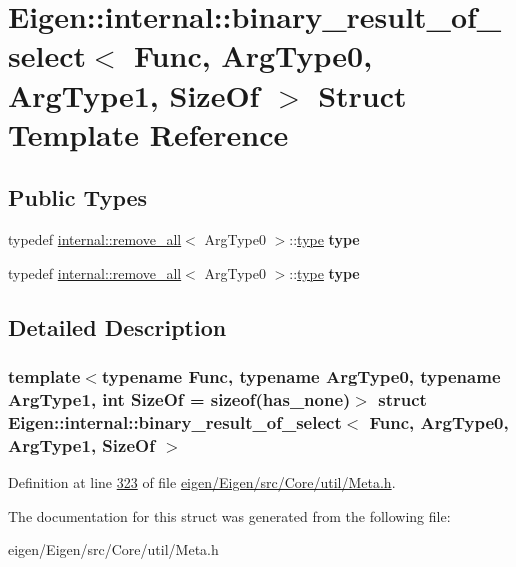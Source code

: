 \hypertarget{struct_eigen_1_1internal_1_1binary__result__of__select}{}\section{Eigen\+:\+:internal\+:\+:binary\+\_\+result\+\_\+of\+\_\+select$<$ Func, Arg\+Type0, Arg\+Type1, Size\+Of $>$ Struct Template Reference}
\label{struct_eigen_1_1internal_1_1binary__result__of__select}
\subsection*{Public Types}
\begin{DoxyCompactItemize}
\item 
\mbox{\label{struct_eigen_1_1internal_1_1binary__result__of__select_af0d2f7a6263e74d1ee937e9e182fe553}} 
typedef \hyperlink{struct_eigen_1_1internal_1_1remove__all}{internal\+::remove\+\_\+all}$<$ Arg\+Type0 $>$\+::\hyperlink{group___sparse_core___module}{type} {\bfseries type}
\item 
\mbox{\label{struct_eigen_1_1internal_1_1binary__result__of__select_af0d2f7a6263e74d1ee937e9e182fe553}} 
typedef \hyperlink{struct_eigen_1_1internal_1_1remove__all}{internal\+::remove\+\_\+all}$<$ Arg\+Type0 $>$\+::\hyperlink{group___sparse_core___module}{type} {\bfseries type}
\end{DoxyCompactItemize}


\subsection{Detailed Description}
\subsubsection*{template$<$typename Func, typename Arg\+Type0, typename Arg\+Type1, int Size\+Of = sizeof(has\+\_\+none)$>$\newline
struct Eigen\+::internal\+::binary\+\_\+result\+\_\+of\+\_\+select$<$ Func, Arg\+Type0, Arg\+Type1, Size\+Of $>$}



Definition at line \hyperlink{eigen_2_eigen_2src_2_core_2util_2_meta_8h_source_l00323}{323} of file \hyperlink{eigen_2_eigen_2src_2_core_2util_2_meta_8h_source}{eigen/\+Eigen/src/\+Core/util/\+Meta.\+h}.



The documentation for this struct was generated from the following file\+:\begin{DoxyCompactItemize}
\item 
eigen/\+Eigen/src/\+Core/util/\+Meta.\+h\end{DoxyCompactItemize}
